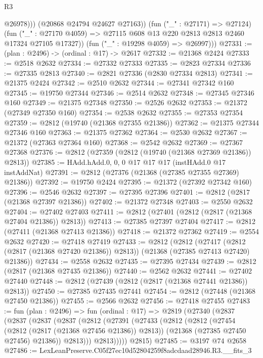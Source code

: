 \begin{lexlean}{R3}
\begin{coremodule}
                  @26978)))
            (@20868 @24794 @24627 @27163))
          (fun ("_" : @27171) => @27124)
          (fun ("_" : @27170 @4059) => @27115 @608 @13 @220 @2813 @2813 @2460 @17324 @27105 @17327))
        (fun ("_" : @19298 @4059) => @26997)))
@27331 := (plan : @2496) -> (ordinal : @17) -> @2617
@27332 := @21368 @2424
@27333 := @2518 @2632
@27334 := @27332 @27333
@27335 := @2823 @27334
@27336 := @27335 @2813
@27340 := @2821 @27336 (@2830 @27334 @2813)
@27341 := @21375 @2424
@27342 := @2510 @2632
@27344 := @27341 @27342 @160
@27345 := @19750 @27344
@27346 := @2514 @2632
@27348 := @27345 @27346 @160
@27349 := @21375 @27348
@27350 := @2526 @2632
@27353 := @21372 (@27349 @27350 @160)
@27354 := @2538 @2632
@27355 := @27353 @27354
@27359 := @2812 (@19740 (@21368 @27355 @21386))
@27362 := @21375 @27344 @27346 @160
@27363 := @21375 @27362
@27364 := @2530 @2632
@27367 := @21372 (@27363 @27364 @160)
@27368 := @2542 @2632
@27369 := @27367 @27368
@27376 := @2812 (@27359 (@2812 (@19740 (@21368 @27369 @21386)) @2813))
@27385 := HAdd.hAdd.{0, 0, 0} @17 @17 @17 (instHAdd.{0} @17 instAddNat)
@27391 := @2812 (@27376 (@21368 (@27385 @27355 @27369) @21386))
@27392 := @19750 @2424
@27395 := @21372 (@27392 @27342 @160)
@27396 := @2546 @2632
@27397 := @27395 @27396
@27401 := @2812 (@2817 (@21368 @27397 @21386))
@27402 := @21372 @27348
@27403 := @2550 @2632
@27404 := @27402 @27403
@27411 := @2812 (@27401 (@2812 (@2817 (@21368 @27404 @21386)) @2813))
@27413 := @27385 @27397 @27404
@27417 := @2812 (@27411 (@21368 @27413 @21386))
@27418 := @21372 @27362
@27419 := @2554 @2632
@27420 := @27418 @27419
@27433 := @2812
    (@2812
      (@27417 (@2812 (@2817 (@21368 @27420 @21386)) @2813))
      (@21368 (@27385 @27413 @27420) @21386))
@27434 := @2558 @2632
@27435 := @27395 @27434
@27439 := @2812 (@2817 (@21368 @27435 @21386))
@27440 := @2562 @2632
@27441 := @27402 @27440
@27448 := @2812 (@27439 (@2812 (@2817 (@21368 @27441 @21386)) @2813))
@27450 := @27385 @27435 @27441
@27454 := @2812 (@27448 (@21368 @27450 @21386))
@27455 := @2566 @2632
@27456 := @27418 @27455
@27483 := fun (plan : @2496) =>
  fun (ordinal : @17) =>
  @2819
    (@27340
      (@2837
        (@2837
          (@2837
            (@2837
              (@2812
                (@27391
                  (@27433
                    (@2812
                      (@2812
                        (@27454 (@2812 (@2817 (@21368 @27456 @21386)) @2813))
                        (@21368 (@27385 @27450 @27456) @21386))
                      @2813)))
                @2813)))))
      @2815)
@27485 := @3197 @74 @2658
@27486 := LexLeanPreserve.C05f27ec10d52804259f8adcdaad28946.R3.__fits_3

\end{coremodule}
\end{lexlean}
